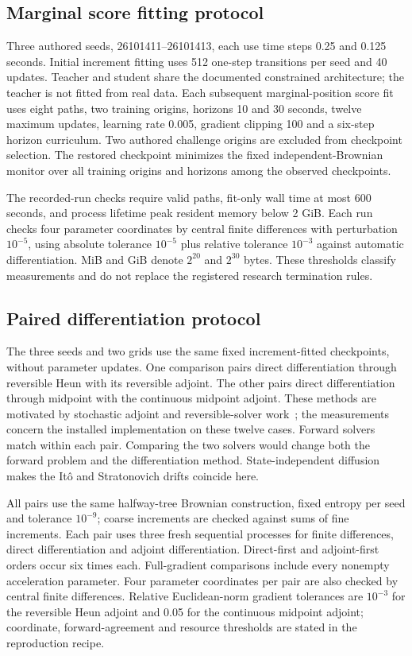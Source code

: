 \documentclass[11pt]{article}
\begin{document}
\subsection{Marginal score fitting protocol}\label{sec:fit-design}
Three authored seeds, 26101411--26101413, each use time steps 0.25 and 0.125 seconds. Initial increment fitting uses 512 one-step transitions per seed and 40 updates. Teacher and student share the documented constrained architecture; the teacher is not fitted from real data. Each subsequent marginal-position score fit uses eight paths, two training origins, horizons 10 and 30 seconds, twelve maximum updates, learning rate 0.005, gradient clipping 100 and a six-step horizon curriculum. Two authored challenge origins are excluded from checkpoint selection. The restored checkpoint minimizes the fixed independent-Brownian monitor over all training origins and horizons among the observed checkpoints.

The recorded-run checks require valid paths, fit-only wall time at most 600 seconds, and process lifetime peak resident memory below 2 GiB. Each run checks four parameter coordinates by central finite differences with perturbation $10^{-5}$, using absolute tolerance $10^{-5}$ plus relative tolerance $10^{-3}$ against automatic differentiation. MiB and GiB denote $2^{20}$ and $2^{30}$ bytes. These thresholds classify measurements and do not replace the registered research termination rules.

\subsection{Paired differentiation protocol}\label{sec:gradient-design}
The three seeds and two grids use the same fixed increment-fitted checkpoints, without parameter updates. One comparison pairs direct differentiation through reversible Heun with its reversible adjoint. The other pairs direct differentiation through midpoint with the continuous midpoint adjoint. These methods are motivated by stochastic adjoint and reversible-solver work~\cite{li2020,kidger2021}; the measurements concern the installed implementation on these twelve cases. Forward solvers match within each pair. Comparing the two solvers would change both the forward problem and the differentiation method. State-independent diffusion makes the It\^o and Stratonovich drifts coincide here.

All pairs use the same halfway-tree Brownian construction, fixed entropy per seed and tolerance $10^{-9}$; coarse increments are checked against sums of fine increments. Each pair uses three fresh sequential processes for finite differences, direct differentiation and adjoint differentiation. Direct-first and adjoint-first orders occur six times each. Full-gradient comparisons include every nonempty acceleration parameter. Four parameter coordinates per pair are also checked by central finite differences. Relative Euclidean-norm gradient tolerances are $10^{-3}$ for the reversible Heun adjoint and 0.05 for the continuous midpoint adjoint; coordinate, forward-agreement and resource thresholds are stated in the reproduction recipe.
\end{document}
